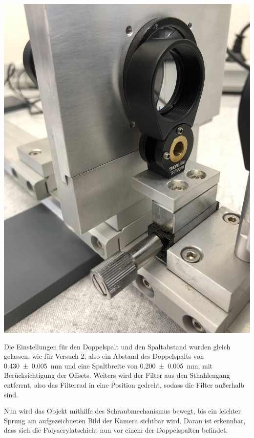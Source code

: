 \documentclass[11pt,ngerman]{scrartcl}
\begin{document}
\begin{center}
	\begin{minipage}[t]{0.5\textwidth}
		\includegraphics[angle=-90,width=\textwidth]{objekt}
		\label{fig:objekt}
	\end{minipage}
\end{center}

\noindent Die Einstellungen für den Doppelspalt und den Spaltabstand wurden gleich gelassen, wie für Versuch 2, also ein Abstand des Doppelspalts von \SI{0.430(5)}{mm} und eine Spaltbreite von \SI{0.200(5)}{mm}, mit Berücksichtigung der Offsets. Weiters wird der Filter aus den Sthahlengang entferrnt, also das Filterrad in eine Position gedreht, sodass die Filter außerhalb sind.

\vspace{2mm}

\noindent Nun wird das Objekt mithilfe des Schraubmechanismus bewegt, bis ein leichter Sprung am aufgezeichneten Bild der Kamera sichtbar wird. Daran ist erkennbar, dass sich die Polyacrylatschicht nun vor einem der Doppelspalten befindet.
\end{document}
